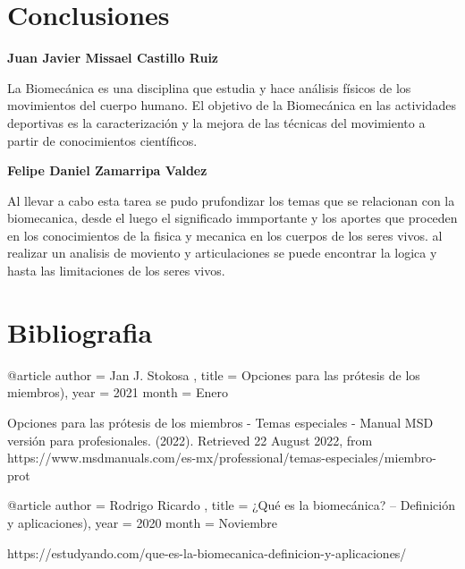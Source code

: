 \documentclass{article}
\begin{document}
\hspace{1cm}



\section{Conclusiones}

\hspace{2cm}

\textbf{Juan Javier Missael Castillo Ruiz}

\hspace{1cm}

La Biomecánica es una disciplina que estudia y hace análisis físicos de los movimientos del cuerpo humano. El objetivo de la Biomecánica en las actividades deportivas es la caracterización y la mejora de las técnicas del movimiento a partir de conocimientos científicos.

\hspace{3cm}

\textbf{Felipe Daniel Zamarripa Valdez}

\hspace{1cm}

Al llevar a cabo esta tarea se pudo prufondizar los temas que se relacionan con la biomecanica, desde el luego el significado immportante y los aportes que proceden en los conocimientos de la fisica y mecanica en los cuerpos de los seres vivos. al realizar un analisis de moviento y articulaciones se puede encontrar la logica y hasta las limitaciones de los seres vivos.

\hspace{3cm}





\clearpage

 \section{Bibliografia}


@article {
         author =  {Jan J. Stokosa },
         title = {Opciones para las prótesis de los miembros)},
         year =  2021
         month = {Enero}
         }
         


\hspace{1cm}

         Opciones para las prótesis de los miembros - Temas especiales - Manual MSD versión para profesionales. (2022). Retrieved 22 August 2022, from https://www.msdmanuals.com/es-mx/professional/temas-especiales/miembro-prot%

\hspace{1cm}

@article {
         author =  {Rodrigo Ricardo },
         title = {¿Qué es la biomecánica? – Definición y aplicaciones)},
         year =  2020
         month = {Noviembre}
         }

         https://estudyando.com/que-es-la-biomecanica-definicion-y-aplicaciones/
         
\end{document}
